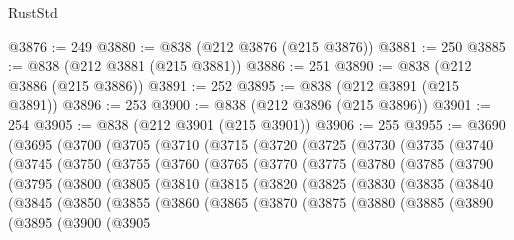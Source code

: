\begin{lexlean}{RustStd}
\begin{coremodule}
@3876 := 249
@3880 := @838 (@212 @3876 (@215 @3876))
@3881 := 250
@3885 := @838 (@212 @3881 (@215 @3881))
@3886 := 251
@3890 := @838 (@212 @3886 (@215 @3886))
@3891 := 252
@3895 := @838 (@212 @3891 (@215 @3891))
@3896 := 253
@3900 := @838 (@212 @3896 (@215 @3896))
@3901 := 254
@3905 := @838 (@212 @3901 (@215 @3901))
@3906 := 255
@3955 := @3690
    (@3695
      (@3700
        (@3705
          (@3710
            (@3715
              (@3720
                (@3725
                  (@3730
                    (@3735
                      (@3740
                        (@3745
                          (@3750
                            (@3755
                              (@3760
                                (@3765
                                  (@3770
                                    (@3775
                                      (@3780
                                        (@3785
                                          (@3790
                                            (@3795
                                              (@3800
                                                (@3805
                                                  (@3810
                                                    (@3815
                                                      (@3820
                                                        (@3825
                                                          (@3830
                                                            (@3835
                                                              (@3840
                                                                (@3845
                                                                  (@3850
                                                                    (@3855
                                                                      (@3860
                                                                        (@3865
                                                                          (@3870
                                                                            (@3875
                                                                              (@3880
                                                                                (@3885
                                                                                  (@3890
                                                                                    (@3895
                                                                                      (@3900
                                                                                        (@3905

\end{coremodule}
\end{lexlean}
